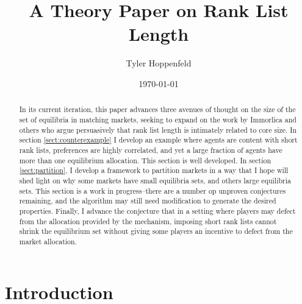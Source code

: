 \documentclass[WP]{AEA}
\begin{document}
\title{A Theory Paper on Rank List Length}
\author{Tyler Hoppenfeld}
\date{\today}
\JEL{}
\Keywords{}

\begin{abstract}
	In its current iteration, this paper advances three avenues of thought on the size of the set of equilibria in matching markets, seeking to expand on the work by Immorlica and others who argue persuasively that rank list length is intimately related to core size. In section
	 \ref{sect:counterexample}
	 I develop an example where agents are content with short rank lists, preferences are highly correlated, and yet a large fraction of agents have more than one equilibrium allocation.  This section is well developed.  In section
	  \ref{sect:partition},
	  I develop a framework to partition markets in a way that I hope will shed light on why some markets have small equilibria sets, and others large equilibria sets. This section is a work in progress--there are a number op unproven conjectures remaining, and the algorithm may still need modification to generate the desired properties. Finally, I advance the conjecture that in a setting where players may defect from the allocation provided by the mechanism, imposing short rank lists cannot shrink the equilibrium set without giving some players an incentive to defect from the market allocation.
\end{abstract}


\maketitle


\section{Introduction}
\end{document}
